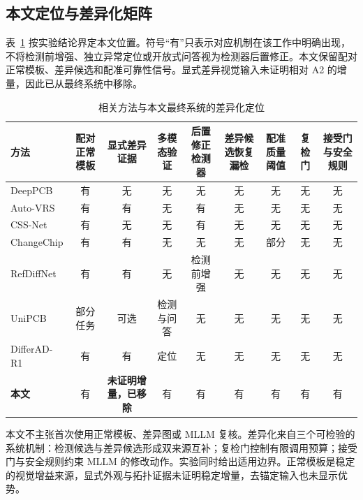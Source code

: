 \subsection{本文定位与差异化矩阵}

表~\ref{tab:positioning} 按实验结论界定本文位置。符号“有”只表示对应机制在该工作中明确出现，不将检测前增强、独立异常定位或开放式问答视为检测器后置修正。本文保留配对正常模板、差异候选和配准可靠性信号。显式差异视觉输入未证明相对 A2 的增量，因此已从最终系统中移除。

\begin{table}[t]
  \centering
  \caption{相关方法与本文最终系统的差异化定位}
  \label{tab:positioning}
  \scriptsize
  \setlength{\tabcolsep}{3.2pt}
  \renewcommand{\arraystretch}{1.18}
  \begin{tabular}{lcccccccc}
    \hline
    方法 & 配对正常模板 & 显式差异证据 & 多模态验证 & 后置修正检测器 & 差异候选恢复漏检 & 配准质量阈值 & 复检门 & 接受门与安全规则 \\
    \hline
    DeepPCB\cite{tang2019deeppcb} & 有 & 无 & 无 & 无 & 无 & 无 & 无 & 无 \\
    Auto-VRS\cite{deng2018autovrs} & 有 & 有 & 无 & 有 & 无 & 无 & 无 & 无 \\
    CSS-Net\cite{miao2021cssnet} & 有 & 无 & 无 & 有 & 无 & 无 & 无 & 无 \\
    ChangeChip\cite{fridman2021changechip} & 有 & 有 & 无 & 无 & 无 & 部分 & 无 & 无 \\
    RefDiffNet\cite{edula2026refdiffnet} & 有 & 有 & 无 & 检测前增强 & 无 & 无 & 无 & 无 \\
    UniPCB\cite{sun2026unipcb} & 部分任务 & 可选 & 检测与问答 & 无 & 无 & 无 & 无 & 无 \\
    DifferAD-R1\cite{wang2026differadr1} & 有 & 有 & 定位 & 无 & 无 & 无 & 无 & 无 \\
    \textbf{本文} & 有 & \textbf{未证明增量，已移除} & 有 & 有 & 有 & 有 & 有 & 有 \\
    \hline
  \end{tabular}
\end{table}

本文不主张首次使用正常模板、差异图或 MLLM 复核。差异化来自三个可检验的系统机制：检测候选与差异候选形成双来源互补；复检门控制有限调用预算；接受门与安全规则约束 MLLM 的修改动作。实验同时给出适用边界。正常模板是稳定的视觉增益来源，显式外观与拓扑证据未证明稳定增量，去锚定输入也未显示优势。
